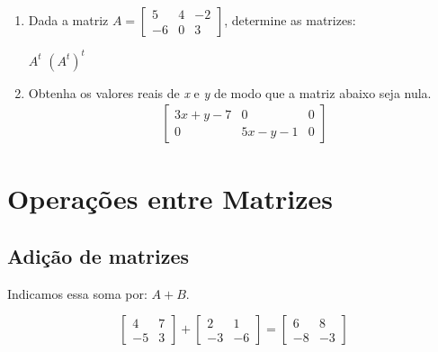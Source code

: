 \begin{enumerate}[label*=\protect\fbox{\arabic{enumi}}]
  \item {
      Dada a matriz $A = \begin{bmatrix}
        5 & 4 & -2 \\
        -6 & 0 & 3
      \end{bmatrix}$,
      determine as matrizes:
      \begin{tasks}
        \task $A^t$
        \task $(A^t)^t$
      \end{tasks}
    }

  \item {
      Obtenha os valores reais de \textit{x} e \textit{y} de modo que a matriz abaixo seja nula.
      \begin{equation*}
          \begin{split}
            \begin{bmatrix}
              3x + y - 7 & 0 & 0 \\
              0 & 5x - y - 1 & 0
            \end{bmatrix}
          \end{split}
      \end{equation*}
    }
\end{enumerate}
  

\section{Operações entre Matrizes}

\subsection{Adição de matrizes}


  Indicamos essa soma por: $A + B$.
\begin{example}
  \begin{equation*}
    \begin{bmatrix}
      4 & 7 \\
      -5 & 3 
    \end{bmatrix}
    + \begin{bmatrix}
      2 & 1 \\
      -3 & -6 
    \end{bmatrix}
    = \begin{bmatrix}
      6 & 8 \\
      -8 & -3 
    \end{bmatrix}
  \end{equation*}
\end{example}

